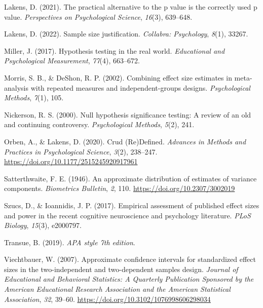 \documentclass[
  man]{apa7}
\newlength{\cslhangindent}
\newlength{\cslentryspacingunit} %
\newenvironment{CSLReferences}[2] %
 {%
  \setlength{\parindent}{0pt}
  \ifodd #1
  \let\oldpar\par
  \def\par{\hangindent=\cslhangindent\oldpar}
  \fi
  \setlength{\parskip}{#2\cslentryspacingunit}
 }%
 {}
\begin{document}
\begin{CSLReferences}{1}{0}
\leavevmode{}%
Lakens, D. (2021). The practical alternative to the p value is the correctly used p value. \emph{Perspectives on Psychological Science}, \emph{16}(3), 639--648.

\leavevmode{}%
Lakens, D. (2022). Sample size justification. \emph{Collabra: Psychology}, \emph{8}(1), 33267.

\leavevmode{}%
Miller, J. (2017). Hypothesis testing in the real world. \emph{Educational and Psychological Measurement}, \emph{77}(4), 663--672.

\leavevmode{}%
Morris, S. B., \& DeShon, R. P. (2002). Combining effect size estimates in meta-analysis with repeated measures and independent-groups designs. \emph{Psychological Methods}, \emph{7}(1), 105.

\leavevmode{}%
Nickerson, R. S. (2000). Null hypothesis significance testing: A review of an old and continuing controversy. \emph{Psychological Methods}, \emph{5}(2), 241.

\leavevmode{}%
Orben, A., \& Lakens, D. (2020). Crud ({Re}){Defined}. \emph{Advances in Methods and Practices in Psychological Science}, \emph{3}(2), 238--247. \url{https://doi.org/10.1177/2515245920917961}

\leavevmode{}%
Satterthwaite, F. E. (1946). An approximate distribution of estimates of variance components. \emph{Biometrics Bulletin}, \emph{2}, 110. \url{https://doi.org/10.2307/3002019}

\leavevmode{}%
Szucs, D., \& Ioannidis, J. P. (2017). Empirical assessment of published effect sizes and power in the recent cognitive neuroscience and psychology literature. \emph{PLoS Biology}, \emph{15}(3), e2000797.

\leavevmode{}%
Transue, B. (2019). \emph{APA style 7th edition}.

\leavevmode{}%
Viechtbauer, W. (2007). Approximate confidence intervals for standardized effect sizes in the two-independent and two-dependent samples design. \emph{Journal of Educational and Behavioral Statistics: A Quarterly Publication Sponsored by the American Educational Research Association and the American Statistical Association}, \emph{32}, 39--60. \url{https://doi.org/10.3102/1076998606298034}


\end{CSLReferences}
\end{document}
